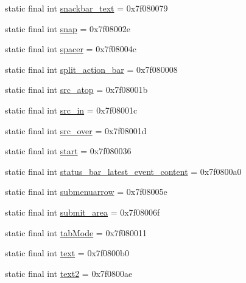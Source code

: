 \begin{CompactItemize}
\item 
static final int \hyperlink{classandroid_1_1support_1_1v7_1_1appcompat_1_1_r_1_1id_874a61f260322f744990b4eebef75781}{snackbar\_\-text} = 0x7f080079
\item 
static final int \hyperlink{classandroid_1_1support_1_1v7_1_1appcompat_1_1_r_1_1id_bc7f9989d449f79b3a7c9e1976426bc0}{snap} = 0x7f08002e
\item 
static final int \hyperlink{classandroid_1_1support_1_1v7_1_1appcompat_1_1_r_1_1id_a4aa1962f2696d8396c814d3c769331f}{spacer} = 0x7f08004c
\item 
static final int \hyperlink{classandroid_1_1support_1_1v7_1_1appcompat_1_1_r_1_1id_305ab80770ffe6a9f443ec840387a783}{split\_\-action\_\-bar} = 0x7f080008
\item 
static final int \hyperlink{classandroid_1_1support_1_1v7_1_1appcompat_1_1_r_1_1id_8cc8ccd06596f4885b228e89f41cc12b}{src\_\-atop} = 0x7f08001b
\item 
static final int \hyperlink{classandroid_1_1support_1_1v7_1_1appcompat_1_1_r_1_1id_714ad167ac9a6a9be50d7bcb77bb34bf}{src\_\-in} = 0x7f08001c
\item 
static final int \hyperlink{classandroid_1_1support_1_1v7_1_1appcompat_1_1_r_1_1id_4baa136214e85c7861ee17eafff51c83}{src\_\-over} = 0x7f08001d
\item 
static final int \hyperlink{classandroid_1_1support_1_1v7_1_1appcompat_1_1_r_1_1id_8ca1a32f00ccefedfda54a14e90e9d2b}{start} = 0x7f080036
\item 
static final int \hyperlink{classandroid_1_1support_1_1v7_1_1appcompat_1_1_r_1_1id_d23dead765fef65efa0d234e238eba6e}{status\_\-bar\_\-latest\_\-event\_\-content} = 0x7f0800a0
\item 
static final int \hyperlink{classandroid_1_1support_1_1v7_1_1appcompat_1_1_r_1_1id_917f9f77e3511f2bbc151965253e97fd}{submenuarrow} = 0x7f08005e
\item 
static final int \hyperlink{classandroid_1_1support_1_1v7_1_1appcompat_1_1_r_1_1id_8b07b2fb1cfeaf29beb8c8fb9a1f1bda}{submit\_\-area} = 0x7f08006f
\item 
static final int \hyperlink{classandroid_1_1support_1_1v7_1_1appcompat_1_1_r_1_1id_0c1ce60a4f406ddc25e4ebaa0daa1c64}{tabMode} = 0x7f080011
\item 
static final int \hyperlink{classandroid_1_1support_1_1v7_1_1appcompat_1_1_r_1_1id_dd3b93e3e5bc8592e4307ae6ea24e957}{text} = 0x7f0800b0
\item 
static final int \hyperlink{classandroid_1_1support_1_1v7_1_1appcompat_1_1_r_1_1id_f92a3e51ca4996afd616f83677acca5d}{text2} = 0x7f0800ae

\end{CompactItemize}
